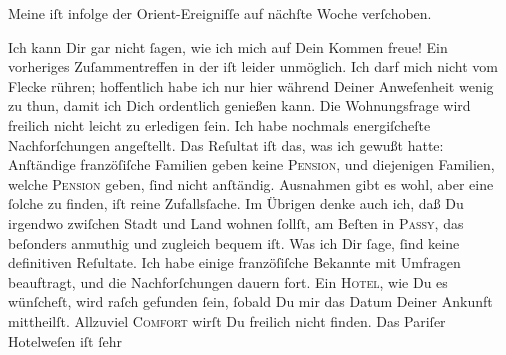 \pstart
           Meine \label{K_L02805-3v}\label{K_L02805-3} iſt infolge der Orient-Ereigniſſe auf nächſte Woche verſchoben.\pend
           
\pstart
           {\pb}Ich kann Dir gar nicht ſagen, wie ich mich auf Dein
               Kommen freue! Ein vorheriges Zuſammentreffen in der \label{K_L02805-4v}\label{K_L02805-4} iſt leider unmöglich. Ich darf mich nicht vom Flecke
               rühren; hoffentlich habe ich nur hier während Deiner Anweſenheit wenig zu thun, damit
               ich Dich ordentlich genießen kann. Die Wohnungsfrage wird freilich nicht leicht zu
               erledigen ſein.  Ich habe nochmals energiſcheſte
               Nachforſchungen angeſtellt. Das Reſultat iſt das, was ich gewußt hatte: Anſtändige
                  franzöſiſche Familien geben
               keine \textsc{Pension}, und diejenigen Familien, welche \textsc{Pension} geben, ſind nicht anſtändig. Ausnahmen gibt {\pb}es wohl, aber eine ſolche zu finden, iſt reine
               Zufallsſache. Im Übrigen denke auch ich, daß Du irgendwo zwiſchen Stadt und Land
               wohnen ſollſt, am Beſten in \textsc{Passy}, das beſonders anmuthig und zugleich bequem iſt. Was ich Dir ſage, ſind keine
               definitiven Reſultate. Ich habe einige franzöſiſche Bekannte mit Umfragen beauftragt, und die
               Nachforſchungen dauern fort. Ein \textsc{Hotel}, wie Du es
               wünſcheſt, wird raſch gefunden ſein, ſobald Du mir das Datum  Deiner Ankunft mittheilſt. Allzuviel \textsc{Comfort} wirſt Du freilich nicht finden. Das Pariſer {\pb}Hotelweſen iſt ſehr
